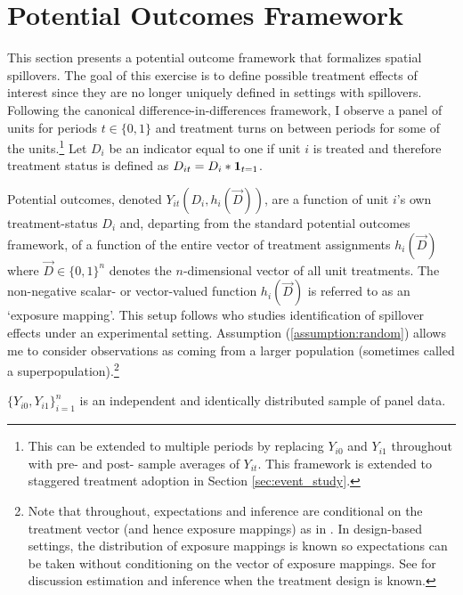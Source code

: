 \documentclass[11pt]{article}
\begin{document}
\section{Potential Outcomes Framework}
\label{sec:po_framework}

This section presents a potential outcome framework that formalizes spatial spillovers. The goal of this exercise is to define possible treatment effects of interest since they are no longer uniquely defined in settings with spillovers. Following the canonical difference-in-differences framework, I observe a panel of units for periods $t \in \{0,1\}$ and treatment turns on between periods for some of the units.\footnote{This can be extended to multiple periods by replacing $Y_{i0}$ and $Y_{i1}$ throughout with pre- and post- sample averages of $Y_{it}$. This framework is extended to staggered treatment adoption in Section \ref{sec:event_study}.} Let $D_{i}$ be an indicator equal to one if unit $i$ is treated and therefore treatment status is defined as $D_{it} = D_{i} * \mathbf{1}_{t = 1}$.

Potential outcomes, denoted $Y_{it}(D_i, h_i(\vec{D}))$, are a function of unit $i$'s own treatment-status $D_i$ and, departing from the standard potential outcomes framework, of a function of the entire vector of treatment assignments $h_i(\vec{D})$ where $\vec{D} \in \{0,1 \}^n$ denotes the $n$-dimensional vector of all unit treatments. The non-negative scalar- or vector-valued function $h_i(\vec{D})$ is referred to as an `exposure mapping'. This setup follows \citet{vazquez2022identification} who studies identification of spillover effects under an experimental setting. Assumption (\ref{assumption:random}) allows me to consider observations as coming from a larger population (sometimes called a superpopulation).\footnote{Note that throughout, expectations and inference are conditional on the treatment vector (and hence exposure mappings) as in \citet{Borusyak_Jaravel_Spiess_2021}. In design-based settings, the distribution of exposure mappings is known so expectations can be taken without conditioning on the vector of exposure mappings. See \citet{Savje_Aronow_Hudgens_2021} for discussion estimation and inference when the treatment design is known.} 

\begin{assumption}\label{assumption:random}
  $\{ Y_{i0}, Y_{i1} \}_{i = 1}^{n}$ is an independent and identically distributed sample of panel data.
\end{assumption}
\end{document}
